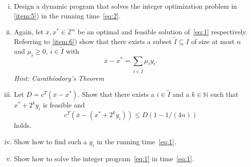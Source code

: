\documentclass[11pt,a4paper]{article}
\newcommand{\wt}[1]{\widetilde{#1}}
\newcommand{\wb}[1]{\overline{#1}}
\begin{document}
\begin{enumerate}[i)]
\item Design a dynamic program that solves the integer optimization problem in \ref{item:5}) in the running time~\eqref{eq:2}. 

\item   Again, let  $\wb{x},x^* ∈ℤ^n$  be an optimal  and feasible solution of~\eqref{eq:1} respectively. Referring to \ref{item:6}) show that there exists a subset $\wt{I} ⊆ I$ of size at most $n$ and $μ_i ≥0$, $i ∈ \wt{I}$ with
  \begin{displaymath}
    \wb{x}-x^* = ∑_{i ∈\wt{I}} μ_i y_i. 
  \end{displaymath}
  \hfill \emph{Hint: Carathéodory's Theorem} 

\item Let $D = c^T ( \wb{x}-x^*)$. Show that there exists a $i ∈ \wt{I}$ and a $k∈ ℕ$ such that $x^* + 2^k y_i$ is feasible and
  \begin{displaymath}
    c^T  (\wb{x}- (x^* + 2^k y_i)) ≤ D (1 - 1/(4n)) 
  \end{displaymath}
  holds.

\item Show how to find such a $y_i$ in the running time~\eqref{eq:1}.
\item Show how to solve the integer program~\eqref{eq:1} in time~\eqref{eq:1}. 
  
\end{enumerate}

 

%
%


 
\end{document}
